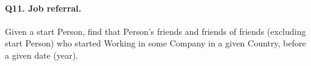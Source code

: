 \paragraph{\textbf{Q11}. Job referral.}
Given a start Person, find that Person's friends and friends of friends
(excluding start Person) who started Working in some Company in a given
Country, before a given date (year).
